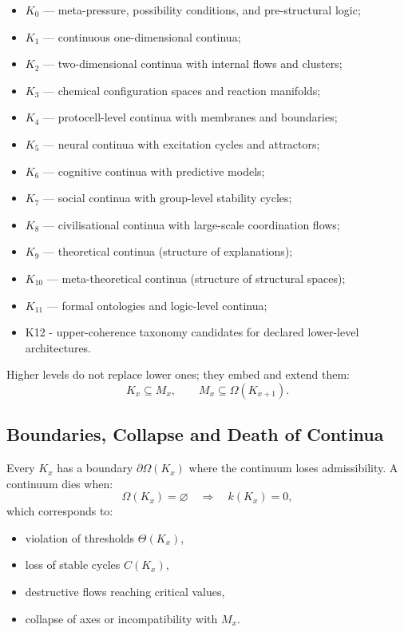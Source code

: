 \begin{itemize}
    \item $K_0$ — meta-pressure, possibility conditions, and pre-structural logic;
    \item $K_1$ — continuous one-dimensional continua;
    \item $K_2$ — two-dimensional continua with internal flows and clusters;
    \item $K_3$ — chemical configuration spaces and reaction manifolds;
    \item $K_4$ — protocell-level continua with membranes and boundaries;
    \item $K_5$ — neural continua with excitation cycles and attractors;
    \item $K_6$ — cognitive continua with predictive models;
    \item $K_7$ — social continua with group-level stability cycles;
    \item $K_8$ — civilisational continua with large-scale coordination flows;
    \item $K_9$ — theoretical continua (structure of explanations);
    \item $K_{10}$ — meta-theoretical continua (structure of structural spaces);
    \item $K_{11}$ — formal ontologies and logic-level continua;
    \item K12 - upper-coherence taxonomy candidates for declared lower-level architectures.
\end{itemize}

Higher levels do not replace lower ones; they embed and extend them:
\[
K_x \subseteq M_x,
\qquad
M_x \subseteq \Omega(K_{x+1}).
\]


\subsection{Boundaries, Collapse and Death of Continua}

Every $K_x$ has a boundary $\partial\Omega(K_x)$ where the
continuum loses admissibility.
A continuum dies when:
\[
\Omega(K_x) = \varnothing
\quad\Rightarrow\quad
k(K_x) = 0,
\]
which corresponds to:
\begin{itemize}
    \item violation of thresholds $\Theta(K_x)$,
    \item loss of stable cycles $C(K_x)$,
    \item destructive flows reaching critical values,
    \item collapse of axes or incompatibility with $M_x$.
\end{itemize}

